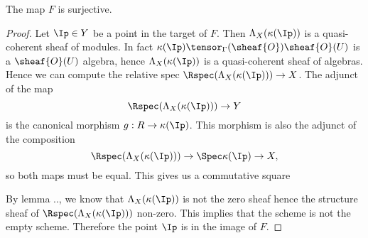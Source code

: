 \begin{lemma}
The map $F$ is surjective.
\end{lemma}
\begin{proof}
Let $\Ip\in Y$ be a point in the target of $F$.
Then $\Lambda_X(\kappa(\Ip))$ is a quasi-coherent sheaf of modules.
In fact $\kappa(\Ip)\tensor_\Gamma(\sheaf{O}) \sheaf{O}(U)$ is a $\sheaf{O}(U)$ algebra, hence $\Lambda_X(\kappa(\Ip))$ is a quasi-coherent sheaf of algebras.
Hence we can compute the relative spec $\Rspec(\Lambda_X(\kappa(\Ip)))\rightarrow X$. The adjunct of the map
\[\Rspec(\Lambda_X(\kappa(\Ip)))\rightarrow Y\] is the canonical morphism $g:R\rightarrow \kappa(\Ip)$. 
This morphism is also the adjunct of the composition
\[\Rspec(\Lambda_X(\kappa(\Ip)))\rightarrow \Spec \kappa(\Ip)\rightarrow X,\]
so both maps must be equal. This gives us a commutative square

\begin{center}
\end{center}

By lemma .., we know that $\Lambda_X(\kappa(\Ip))$ is not the zero sheaf hence the structure sheaf of $\Rspec(\Lambda_X(\kappa(\Ip)))$ non-zero.
This implies that the scheme is not the empty scheme. Therefore the point $\Ip$ is in the image of $F$.
\end{proof}

